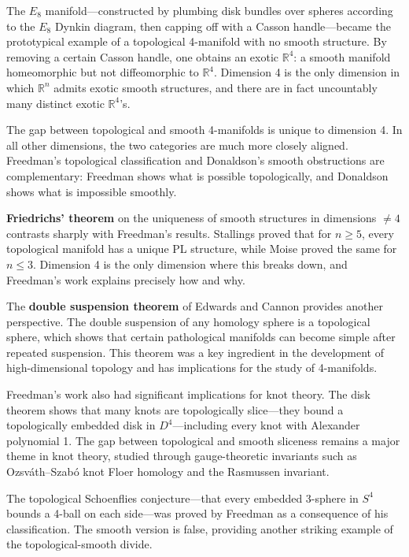 The $E_8$ manifold---constructed by plumbing disk bundles over spheres according to the $E_8$ Dynkin diagram, then capping off with a Casson handle---became the prototypical example of a topological 4-manifold with no smooth structure. By removing a certain Casson handle, one obtains an exotic $\mathbb{R}^4$: a smooth manifold homeomorphic but not diffeomorphic to $\mathbb{R}^4$. Dimension 4 is the only dimension in which $\mathbb{R}^n$ admits exotic smooth structures, and there are in fact uncountably many distinct exotic $\mathbb{R}^4$'s.

The gap between topological and smooth 4-manifolds is unique to dimension 4. In all other dimensions, the two categories are much more closely aligned. Freedman's topological classification and Donaldson's smooth obstructions are complementary: Freedman shows what is possible topologically, and Donaldson shows what is impossible smoothly.

\textbf{Friedrichs' theorem} on the uniqueness of smooth structures in dimensions $\neq 4$ contrasts sharply with Freedman's results. Stallings proved that for $n \geq 5$, every topological manifold has a unique PL structure, while Moise proved the same for $n \leq 3$. Dimension 4 is the only dimension where this breaks down, and Freedman's work explains precisely how and why.

The \textbf{double suspension theorem} of Edwards and Cannon provides another perspective. The double suspension of any homology sphere is a topological sphere, which shows that certain pathological manifolds can become simple after repeated suspension. This theorem was a key ingredient in the development of high-dimensional topology and has implications for the study of 4-manifolds.

Freedman's work also had significant implications for knot theory. The disk theorem shows that many knots are topologically slice---they bound a topologically embedded disk in $D^4$---including every knot with Alexander polynomial 1. The gap between topological and smooth sliceness remains a major theme in knot theory, studied through gauge-theoretic invariants such as Ozsv\'ath--Szab\'o knot Floer homology and the Rasmussen invariant.

The topological Schoenflies conjecture---that every embedded 3-sphere in $S^4$ bounds a 4-ball on each side---was proved by Freedman as a consequence of his classification. The smooth version is false, providing another striking example of the topological-smooth divide.

